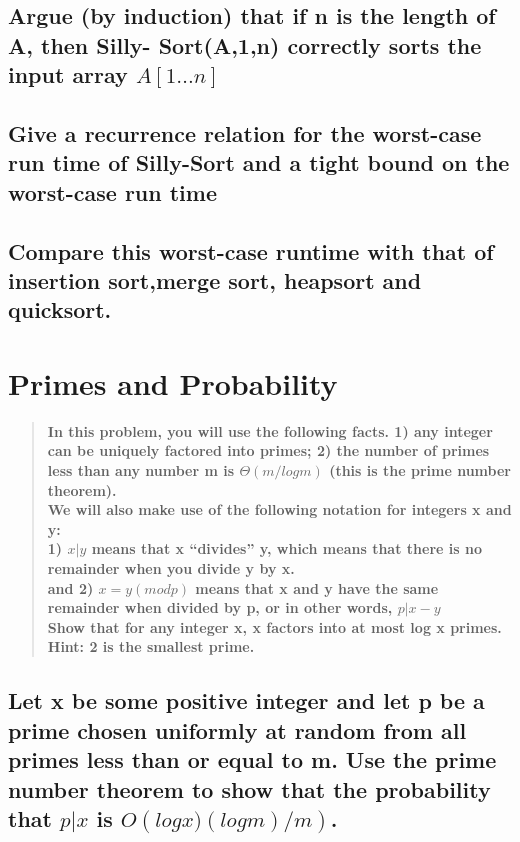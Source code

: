\documentclass[titlepage]{article}\usepackage[]{graphicx}\usepackage[]{color}
\begin{document}
\subsection{ Argue (by induction) that if n is the
length of A, then Silly- Sort(A,1,n)
correctly sorts the input array
$A[1\dots n]$}


\subsection{ Give a recurrence relation for the worst-case run time of Silly-Sort and a
tight bound on the worst-case run time}

\subsection{ Compare this worst-case runtime with that of insertion sort,merge
sort, heapsort and quicksort.}





\section{Primes and Probability}

\begin{quote}
	\textbf{
In this problem, you will use the following facts. 1) any integer can be
uniquely factored into primes; 2) the number of primes less than any number m
is $\Theta(m/ log m)$ (this is the prime number theorem). \\
We will also make use of the following notation for integers x and y: \\
1) $x|y$ means that x ``divides'' y, which means that there is no remainder
when you divide y by x. \\ 
and 2) $ x = y(modp)$ means that x and y have the same remainder when
divided by p, or in other words, $p|x−y$ \\
Show that for any integer x, x factors into at most log x primes. Hint: 2 is
the smallest prime.}
\end{quote}


\subsection{ Let x be some positive integer and let p be a prime chosen uniformly at
random from all primes less than or equal to m. Use the prime number theorem to
show that the probability that $p|x$ is $O\left( log x)(log m)/m\right)$. }
\end{document}
